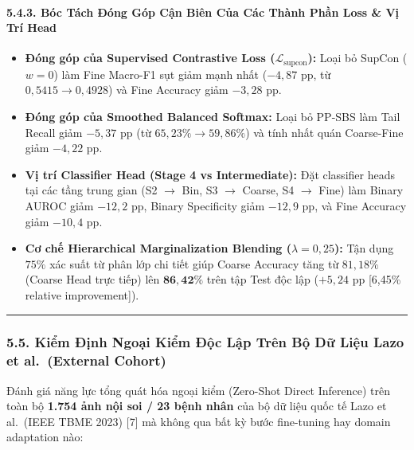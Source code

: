 \documentclass[
  11pt,
  a4paper,
]{article}
\providecommand{\tightlist}{%
  \setlength{\itemsep}{0pt}\setlength{\parskip}{0pt}}
\begin{document}
\paragraph{5.4.3. Bóc Tách Đóng Góp Cận Biên Của Các Thành Phần Loss \&
Vị Trí
Head}\label{buxf3c-tuxe1ch-ux111uxf3ng-guxf3p-cux1eadn-biuxean-cux1ee7a-cuxe1c-thuxe0nh-phux1ea7n-loss-vux1ecb-truxed-head}

\begin{itemize}
\tightlist
\item
  \textbf{Đóng góp của Supervised Contrastive Loss
  (\(\mathcal{L}_{\text{supcon}}\)):} Loại bỏ SupCon (\(w=0\)) làm Fine
  Macro-F1 sụt giảm mạnh nhất (\(-4{,}87\) pp, từ
  \(0{,}5415 \to 0{,}4928\)) và Fine Accuracy giảm \(-3{,}28\) pp.
\item
  \textbf{Đóng góp của Smoothed Balanced Softmax:} Loại bỏ PP-SBS làm
  Tail Recall giảm \(-5{,}37\) pp (từ \(65{,}23\% \to 59{,}86\%\)) và
  tính nhất quán Coarse-Fine giảm \(-4{,}22\) pp.
\item
  \textbf{Vị trí Classifier Head (Stage 4 vs Intermediate):} Đặt
  classifier heads tại các tầng trung gian (S2 \(\to\) Bin, S3 \(\to\)
  Coarse, S4 \(\to\) Fine) làm Binary AUROC giảm \(-12{,}2\) pp, Binary
  Specificity giảm \(-12{,}9\) pp, và Fine Accuracy giảm \(-10{,}4\) pp.
\item
  \textbf{Cơ chế Hierarchical Marginalization Blending
  (\(\lambda=0{,}25\)):} Tận dụng \(75\%\) xác suất từ phân lớp chi tiết
  giúp Coarse Accuracy tăng từ \(81{,}18\%\) (Coarse Head trực tiếp) lên
  \(\mathbf{86{,}42\%}\) trên tập Test độc lập (\(+5{,}24\) pp {[}6,45\%
  relative improvement{]}).
\end{itemize}

\begin{center}\rule{0.5\linewidth}{0.5pt}\end{center}

\subsubsection{5.5. Kiểm Định Ngoại Kiểm Độc Lập Trên Bộ Dữ Liệu Lazo et
al.~(External
Cohort)}\label{kiux1ec3m-ux111ux1ecbnh-ngoux1ea1i-kiux1ec3m-ux111ux1ed9c-lux1eadp-truxean-bux1ed9-dux1eef-liux1ec7u-lazo-et-al.-external-cohort}

Đánh giá năng lực tổng quát hóa ngoại kiểm (Zero-Shot Direct Inference)
trên toàn bộ \textbf{1.754 ảnh nội soi / 23 bệnh nhân} của bộ dữ liệu
quốc tế Lazo et al.~(IEEE TBME 2023) {[}7{]} mà không qua bất kỳ bước
fine-tuning hay domain adaptation nào:
\end{document}
